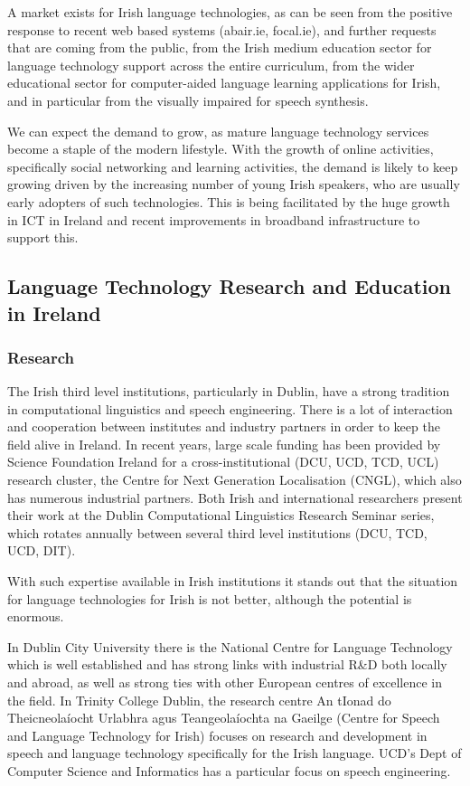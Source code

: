 \begin{multicols}{2}
A market exists for Irish language technologies, as can be seen from the positive response to recent web based systems (abair.ie, focal.ie), and further requests that are coming from the public, from the Irish medium education sector for language technology support across the entire curriculum,  from the wider educational sector for computer-aided language learning applications for Irish, and in particular from the visually impaired for speech synthesis. 

We can expect the demand to grow, as mature language technology services become a staple of the modern lifestyle. With the growth of online activities, specifically social networking and learning activities, the demand is likely to keep growing  driven by the increasing number  of young Irish speakers, who are usually early adopters of such technologies. This is being facilitated by the huge growth in ICT in Ireland and recent improvements in broadband infrastructure to support this.


\subsection{Language Technology Research and Education in Ireland}

\subsubsection{Research}

The Irish third level institutions, particularly in Dublin, have a strong tradition in computational linguistics and speech engineering. There is a lot of interaction and cooperation between institutes and industry partners in order to keep the field alive in Ireland. In recent years, large scale funding has been provided by Science Foundation Ireland for a cross-institutional (DCU, UCD, TCD, UCL) research cluster, the Centre for Next Generation Localisation (CNGL), which also has numerous industrial partners. Both Irish and international researchers present their work at the Dublin Computational Linguistics Research Seminar series, which  rotates annually between several third level institutions (DCU, TCD, UCD, DIT). 

With such expertise available in Irish institutions it stands out that the situation for language technologies for Irish is not better, although the potential is enormous. 

In Dublin City University there is the National Centre for Language Technology which is well established and has strong links with industrial R\&D both locally and abroad, as well as strong ties with other European centres of excellence in the field. In Trinity College Dublin, the research centre An tIonad do Theicneolaíocht Urlabhra agus Teangeolaíochta na Gaeilge (Centre for Speech and Language Technology for Irish) focuses on research and development in speech and language technology specifically for the Irish language. UCD’s Dept of Computer Science and Informatics has a particular focus on speech engineering.



\end{multicols}
